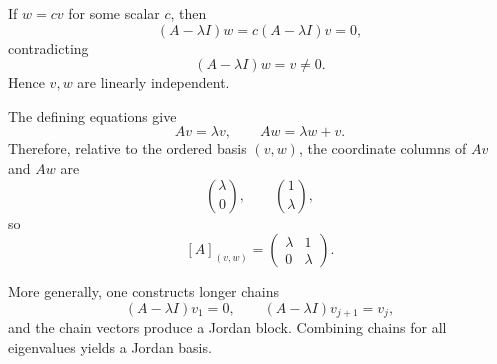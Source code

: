 \begin{solution}
If \(w=cv\) for some scalar \(c\), then
\[
(A-\lambda I)w
=
c(A-\lambda I)v
=
0,
\]
contradicting
\[
(A-\lambda I)w=v\neq0.
\]
Hence \(v,w\) are linearly independent.

The defining equations give
\[
Av=\lambda v,
\qquad
Aw=\lambda w+v.
\]
Therefore, relative to the ordered basis \((v,w)\), the coordinate columns of \(Av\) and \(Aw\)
are
\[
\binom{\lambda}{0},
\qquad
\binom{1}{\lambda},
\]
so
\[
[A]_{(v,w)}
=
\begin{pmatrix}
\lambda&1\\
0&\lambda
\end{pmatrix}.
\]

More generally, one constructs longer chains
\[
(A-\lambda I)v_1=0,\qquad
(A-\lambda I)v_{j+1}=v_j,
\]
and the chain vectors produce a Jordan block. Combining chains for all eigenvalues yields a
Jordan basis.
\end{solution}

